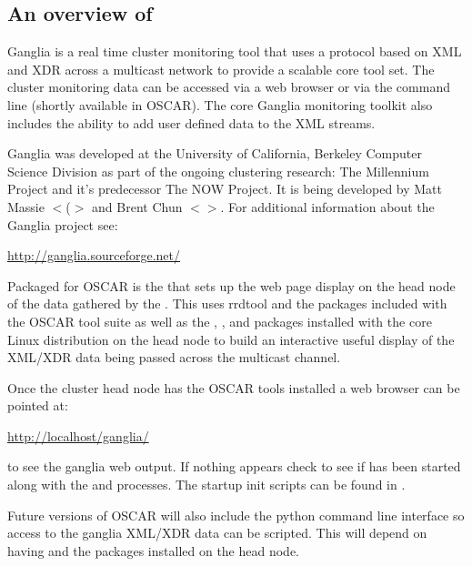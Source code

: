 %
%
%

\subsection{An overview of }
\label{app:ganglia-overview}

Ganglia is a real time cluster monitoring tool that uses a protocol
based on XML and XDR across a multicast network to provide a scalable
core tool set.  The cluster monitoring data can be accessed via a web
browser or via the command line (shortly available in OSCAR). The core
Ganglia monitoring toolkit also includes the ability to add user
defined data to the XML streams.

Ganglia was developed at the University of California, Berkeley
Computer Science Division as part of the ongoing clustering research:
The Millennium Project and it's predecessor The NOW Project.  It is
being developed by Matt Massie $<$($>$
and Brent Chun $<$$>$. For additional
information about the Ganglia project see:

\vspace{10pt}
\centerline{\url{http://ganglia.sourceforge.net/}}
\vspace{10pt}

Packaged for OSCAR is the  that sets
up the web page display on the head node of the data gathered by the
.  This uses rrdtool and the
 packages included with the OSCAR tool suite
as well as the , , and 
packages installed with the core Linux distribution on the head node
to build an interactive useful display of the XML/XDR data being
passed across the multicast channel.

Once the cluster head node has the OSCAR tools installed a web browser
can be pointed at:

\vspace{10pt}
\centerline{\url{http://localhost/ganglia/}}
\vspace{10pt}

\noindent to see the ganglia web output. If nothing appears check to
see if  has been started along with the  and
 processes. The startup init scripts can be found
in .

Future versions of OSCAR will also include the  python
command line interface so access to the ganglia XML/XDR data can be
scripted. This will depend on having  and the
 packages installed on the head node.


